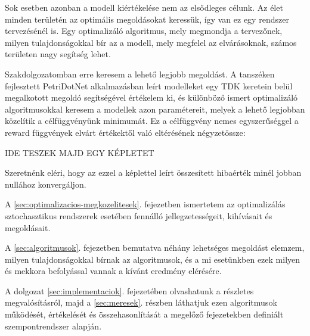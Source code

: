 Sok esetben azonban a modell kiértékelése nem az elsődleges célunk. Az élet minden területén az optimális megoldásokat keressük, így van ez egy rendszer tervezésénél is. Egy optimalizáló algoritmus, mely megmondja a tervezőnek, milyen tulajdonságokkal bír az a modell, mely megfelel az elvárásoknak, számos területen nagy segítség lehet.

Szakdolgozatomban erre keresem a lehető legjobb megoldást. A tanszéken fejlesztett PetriDotNet alkalmazásban leírt modelleket egy TDK keretein belül megalkotott megoldó\cite{SpdnTDK} segítségével értékelem ki, és különböző ismert optimalizáló algoritmusokkal keresem a modellek azon paramétereit, melyek a lehető legjobban közelítik a célfüggvényünk minimumát. Ez a célfüggvény nemes egyszerűséggel a reward függvények elvárt értékektől való eltérésének négyzetössze:

IDE TESZEK MAJD EGY KÉPLETET

Szeretnénk eléri, hogy az ezzel a képlettel leírt összesített hibaérték minél jobban nullához konvergáljon.

A \ref{sec:optimalizacios-megkozelitesek}. fejezetben ismertetem az optimalizálás sztochasztikus rendszerek esetében fennálló jellegzetességeit, kihívásait és megoldásait.

A \ref{sec:algoritmusok}. fejezetben bemutatva néhány lehetséges megoldást elemzem, milyen tulajdonságokkal bírnak az algoritmusok, és a mi esetünkben ezek milyen és mekkora befolyással vannak a kívánt eredmény elérésére.

A dolgozat \ref{sec:implementaciok}. fejezetében olvashatunk a részletes megvalósításról, majd a \ref{sec:meresek}. részben láthatjuk ezen algoritmusok működését, értékelését és összehasonlítását a megelőző fejezetekben definiált szempontrendszer alapján.